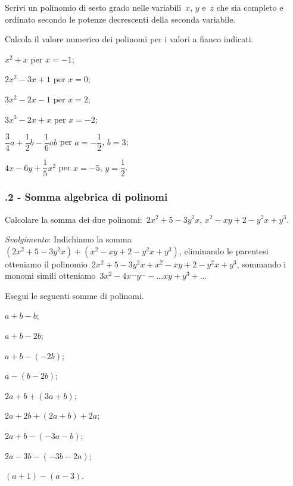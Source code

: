 \begin{multicols}{2}
\begin{esercizio}
\label{ese:11.10}
Scrivi un polinomio di sesto grado nelle variabili~$x$, $y$ e~$z$ che sia completo e ordinato secondo le
potenze decrescenti della seconda variabile.
\end{esercizio}


\begin{esercizio}
\label{ese:11.11}
Calcola il valore numerico dei polinomi per i valori a fianco indicati.

\begin{enumeratea}
\item $x^2+x$ per $x=-1$;
\item $2x^2-3x+1$ per $x=0$;
\item $3x^2-2x-1$ per $x=2$;
\item $3x^3-2x+x$ per $x=-2$;
\item $\dfrac{3}{4}a+\dfrac{1}{2}b-\dfrac{1}{6}ab$ per $a=-\dfrac{1}{2}$, $b=3$;
\item $4x-6y+\dfrac{1}{5}x^2$ per $x=-5$, $y=\dfrac{1}{2}$.
\end{enumeratea}
\end{esercizio}
\end{multicols}


\subsubsection*{\thechapter.2 - Somma algebrica di polinomi}
\begin{esercizio}
\label{ese:11.12}
Calcolare la somma dei due polinomi:~$2x^2+5−3y^2x$, $x^2−xy+2−y^2x+y^3$.

\emph{Svolgimento}: Indichiamo la somma~$(2x^2+5−3y^2x)+(x^2−xy+2−y^2x+y^3)$, eliminando le parentesi otteniamo
il polinomio~$2x^2+5−3y^2x+x^2−xy+2−y^2x+y^3$, sommando i monomi simili otteniamo~$3x^2−4x^{\ldots}y^{\ldots}-\ldots xy+y^3+\ldots$
\end{esercizio}
\begin{esercizio}
\label{ese:11.13}
 Esegui le seguenti somme di polinomi.
\begin{multicols}{3}
 \begin{enumeratea}
 \item $a+b-b$;
 \item $a+b-2b$;
 \item $a+b-(-2b)$;
 \item $a-(b-2b)$;
 \item $2a+b+(3a+b)$;
 \item $2a+2b+(2a+b)+2a$;
 \item $2a+b-(-3a-b)$;
 \item $2a-3b-(-3b-2a)$;
 \item $(a+1)-(a-3)$.
\end{enumeratea}
\end{multicols}
\end{esercizio}

